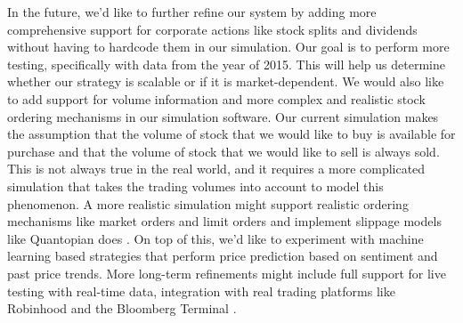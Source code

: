 In the future, we'd like to further refine our system by adding more comprehensive support for corporate actions like stock splits and dividends without having to hardcode them in our simulation.
Our goal is to perform more testing, specifically with data from the year of 2015.
This will help us determine whether our strategy is scalable or if it is market-dependent.
We would also like to add support for volume information and more complex and realistic stock ordering mechanisms in our simulation software.
Our current simulation makes the assumption that the volume of stock that we would like to buy is available for purchase and that the volume of stock that we would like to sell is always sold.
This is not always true in the real world, and it requires a more complicated simulation that takes the trading volumes into account to model this phenomenon.
A more realistic simulation might support realistic ordering mechanisms like market orders and limit orders and implement slippage models like Quantopian does \cite{quantopianSlippage}.
On top of this, we'd like to experiment with machine learning based strategies that perform price prediction based on sentiment and past price trends.
More long-term refinements might include full support for live testing with real-time data, integration with real trading platforms like Robinhood \cite{robinhood} and the Bloomberg Terminal \cite{terminal}. 

